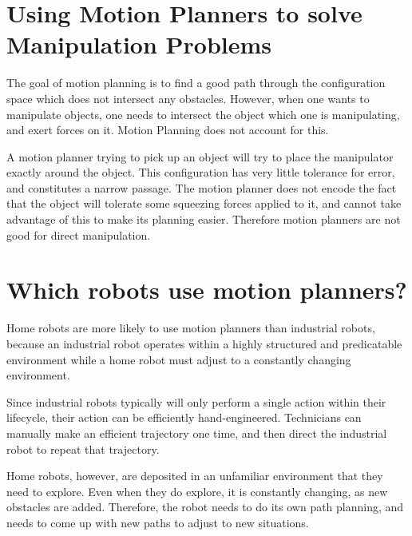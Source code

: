 \documentclass{article}
\DeclareMathOperator{\tr}{Tr}
\begin{document}
\section{Using Motion Planners to solve Manipulation Problems}

The goal of motion planning is to find a good path through the configuration space which
	does not intersect any obstacles.
However, when one wants to manipulate objects, one needs to intersect the object which
	one is manipulating, and exert forces on it.
Motion Planning does not account for this.

A motion planner trying to pick up an object will try to place the manipulator exactly around
	the object.
This configuration has very little tolerance for error, and constitutes a narrow passage.
The motion planner does not encode the fact that the object will tolerate some squeezing 
	forces applied to it, and cannot take advantage of this to make its planning easier.
Therefore motion planners are not good for direct manipulation.

\section{Which robots use motion planners?}

Home robots are more likely to use motion planners than industrial robots, because an industrial
	robot operates within a highly structured and predicatable environment while a home
	robot must adjust to a constantly changing environment.

Since industrial robots typically will only perform a single action within their lifecycle,
	their action can be efficiently hand-engineered.
Technicians can manually make an efficient trajectory one time, and then direct the industrial
	robot to repeat that trajectory.

Home robots, however, are deposited in an unfamiliar environment that they need to explore.
Even when they do explore, it is constantly changing, as new obstacles are added.
Therefore, the robot needs to do its own path planning, and needs to come up with
	new paths to adjust to new situations.


%	
%	
%	
%	
\end{document}
